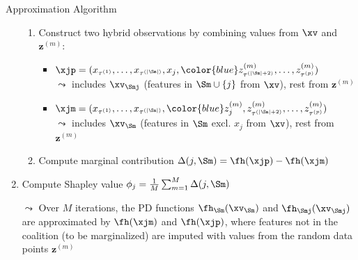\documentclass[11pt,compress,t,notes=noshow, aspectratio=169, xcolor=table]{beamer}
\begin{document}
\begin{frame}{Approximation Algorithm }
\begin{enumerate}[<+->]
\begin{enumerate}
        \item Construct two hybrid observations by combining values from $\xv$ and {\color{blue} $\mathbf{z}^{(m)}$}:
\begin{itemize}
\setlength\itemsep{0.5em}
  \item $
  \xjp = (x_{\tau^{(1)}}, \ldots, x_{\tau^{(|\Sm|)}}, x_j, 
          {\color{blue}z_{\tau^{(|\Sm|+2)}}^{(m)}, \ldots, z_{\tau^{(p)}}^{(m)}})
  $\\
  $\leadsto$ includes $\xv_{\Smj}$ (features in $\Sm \cup \{j\}$ from $\xv$), rest from {\color{blue} $\mathbf{z}^{(m)}$}
  
  \item $
  \xjm = (x_{\tau^{(1)}}, \ldots, x_{\tau^{(|\Sm|)}}, 
          {\color{blue}z_j^{(m)}, z_{\tau^{(|\Sm|+2)}}^{(m)}, \ldots, z_{\tau^{(p)}}^{(m)}})
  $\\
   $\leadsto$ includes $\xv_{\Sm}$ (features in $\Sm$ excl. $x_j$ from $\xv$), rest from {\color{blue} $\mathbf{z}^{(m)}$}
\end{itemize}
        \item Compute marginal contribution $\Delta(j, \Sm) = \fh(\xjp) - \fh(\xjm)$ %
        \end{enumerate}
        
    \item Compute Shapley value $\phi_j = \frac{1}{M}\sum_{m=1}^M \Delta(j, \Sm)$ %
    \item[$\leadsto$] Over $M$ iterations, the PD functions $\fh_{\Sm}(\xv_{\Sm})$ and $\fh_{\Smj}(\xv_{\Smj})$ are approximated by $\fh(\xjm)$ and $\fh(\xjp)$, where features not in the coalition (to be marginalized) are imputed with values from the random data points {\color{blue} $\mathbf{z}^{(m)}$}
  \end{enumerate}
   

\end{frame}
\end{document}
